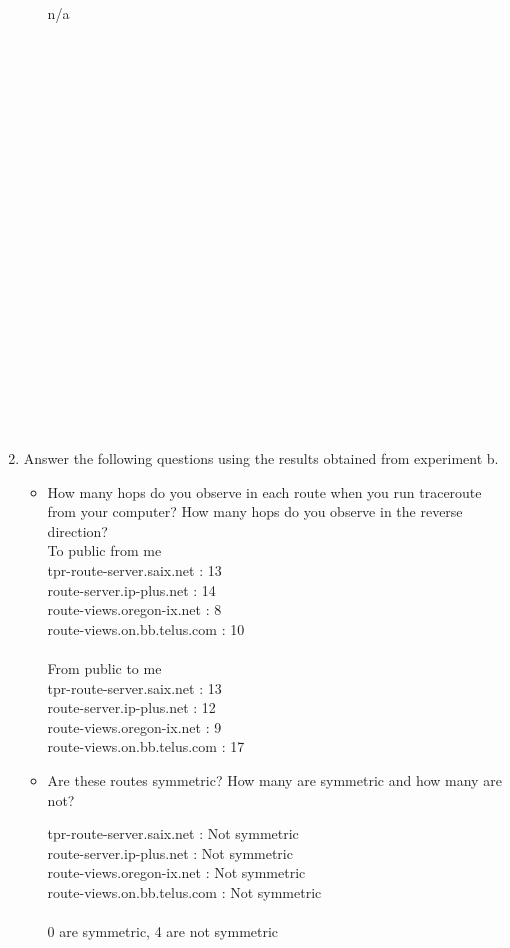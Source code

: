 \documentclass[10pt]{article}
\begin{document}
\begin{enumerate}
\begin{itemize}
n/a
\\
\\
\\
\\
\\
\\
\\
\\
\\
\\
\\
\\
\\
\\
\\
\\
\\
\\
\\
\\
\\
\\
\end{itemize}

\item Answer the following questions using the results obtained from experiment b.

\begin{itemize}

\item How many hops do you observe in each route when you run traceroute from your computer? How many hops do you observe in the reverse direction?
\\
To public from me \\
tpr-route-server.saix.net : 13 \\
route-server.ip-plus.net : 14 \\
route-views.oregon-ix.net : 8 \\
route-views.on.bb.telus.com : 10 \\
\\
From public to me \\
tpr-route-server.saix.net : 13 \\
route-server.ip-plus.net : 12 \\
route-views.oregon-ix.net : 9 \\
route-views.on.bb.telus.com : 17 \\

\item Are these routes symmetric? How many are symmetric and how many are not?

tpr-route-server.saix.net : Not symmetric \\
route-server.ip-plus.net : Not symmetric \\
route-views.oregon-ix.net : Not symmetric \\
route-views.on.bb.telus.com : Not symmetric \\
\\
0 are symmetric, 4 are not symmetric


\end{itemize}
\end{enumerate}
\end{document}
